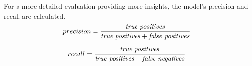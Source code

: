 For a more detailed evaluation providing more insights, the model's precision and recall are calculated.
\begin{equation}
	precision = \frac{\textnormal{\textit{true positives}}}{\textnormal{\textit{true positives}} + \textnormal{\textit{false positives}}}
\end{equation}


\begin{equation}
	recall = \frac{\textnormal{\textit{true positives}}}{\textnormal{\textit{true positives}} + \textnormal{\textit{false negatives}}}
\end{equation}